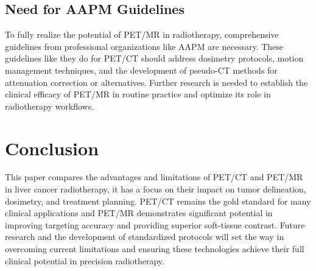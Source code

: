 \documentclass[11pt]{article} %
\begin{document}
\begin{multicols}{2}
\subsection{Need for AAPM Guidelines}
To fully realize the potential of PET/MR in radiotherapy, comprehensive guidelines from professional organizations like AAPM are necessary. These guidelines like they do for PET/CT should address dosimetry protocols, motion management techniques, and the development of pseudo-CT methods for attenuation correction or alternatives. Further research is needed to establish the clinical efficacy of PET/MR in routine practice and optimize its role in radiotherapy workflows.

\section{Conclusion}

This paper compares the advantages and limitations of PET/CT and PET/MR in liver cancer radiotherapy, it has a focus on their impact on tumor delineation, dosimetry, and treatment planning. PET/CT remains the gold standard for many clinical applications and PET/MR demonstrates significant potential in improving targeting accuracy and providing superior soft-tissue contrast. Future research and the development of standardized protocols will set the way in overcoming current limitations and ensuring these technologies achieve their full clinical potential in precision radiotherapy.

\end{multicols}



\end{document}

